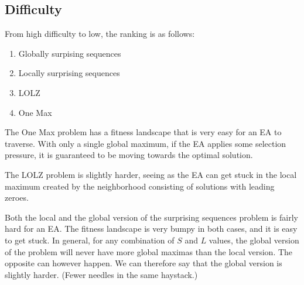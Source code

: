 \documentclass[twoside]{article}
\begin{document}
\begin{multicols}{2}
    \section{Difficulty}

    From high difficulty to low, the ranking is as follows:

    \begin{enumerate}
        \item Globally surpising sequences
        \item Locally surprising sequences
        \item LOLZ
        \item One Max
    \end{enumerate}

    The One Max problem has a fitness landscape that is very easy for an EA to traverse.
    With only a single global maximum, if the EA applies some selection pressure, it is guaranteed to be moving towards the optimal solution.

    The LOLZ problem is slightly harder, seeing as the EA can get stuck in the local maximum created by the neighborhood consisting of solutions with leading zeroes.
    
    Both the local and the global version of the surprising sequences problem is fairly hard for an EA.
    The fitness landscape is very bumpy in both cases, and it is easy to get stuck.
    In general, for any combination of $S$ and $L$ values, the global version of the problem will never have more global maximas than the local version.
    The opposite can however happen.
    We can therefore say that the global version is slightly harder. (Fewer needles in the same haystack.)





\end{multicols}

%
%
\end{document}
